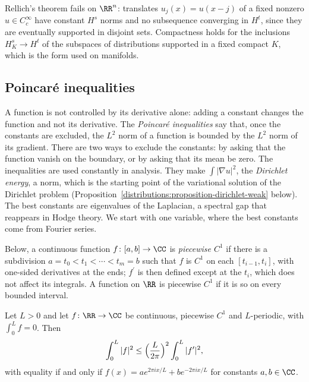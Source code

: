 \begin{counterexample}\label{distributions:counterexample-rellich-rn}
Rellich's theorem fails on $\RR^n$: translates $u_j(x) = u(x - j)$ of a fixed nonzero $u \in C_c^\infty$ have constant $H^s$ norms and no subsequence converging in $H^t$, since they are eventually supported
in disjoint sets. Compactness holds for the inclusions $H^s_K \to H^t$ of the subspaces of distributions supported in a fixed compact $K$, which is the form used on manifolds.
\end{counterexample}

\subsection{Poincar\'e inequalities}\label{distributions:subsection-poincare}

A function is not controlled by its derivative alone: adding a constant changes the function and not its derivative. The \emph{Poincar\'e inequalities} say that, once the constants are excluded,
the $L^2$ norm of a function is bounded by the $L^2$ norm of its gradient. There are two ways to exclude the constants: by asking that the function vanish on the boundary, or by asking that its mean
be zero. The inequalities are used constantly in analysis. They make $\int|\nabla u|^2$, the \emph{Dirichlet energy}, a norm, which is the starting point of the variational solution of
the Dirichlet problem (Proposition~\ref{distributions:proposition-dirichlet-weak} below). The best constants are eigenvalues of the Laplacian, a spectral gap that reappears in Hodge theory. We start
with one variable, where the best constants come from Fourier series.

Below, a continuous function $f \colon [a, b] \to \CC$ is \emph{piecewise $C^1$} if there is a subdivision $a = t_0 < t_1 < \cdots < t_m = b$ such that $f$ is $C^1$ on each $[t_{i-1}, t_i]$, with one-sided
derivatives at the ends; $f^{\prime}$ is then defined except at the $t_i$, which does not affect its integrals. A function on $\RR$ is piecewise $C^1$ if it is so on every bounded interval.

\begin{proposition}\label{distributions:proposition-wirtinger}
Let $L > 0$ and let $f \colon \RR \to \CC$ be continuous, piecewise $C^1$ and $L$-periodic, with $\int_0^Lf = 0$. Then
\[
\int_0^L|f|^2 \leq \Bigl(\frac{L}{2\pi}\Bigr)^2\int_0^L|f^{\prime}|^2,
\]
with equality if and only if $f(x) = ae^{2\pi ix/L} + be^{-2\pi ix/L}$ for constants $a, b \in \CC$.
\end{proposition}

